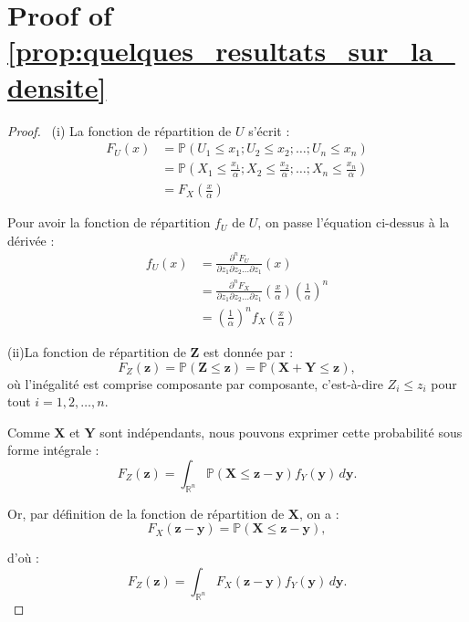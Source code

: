 \documentclass[a4paper,10pt]{article}
\theoremstyle{definition} %
\theoremstyle{definition} %
\theoremstyle{definition} %
\theoremstyle{definition} %
\begin{document}
\section{Proof of \cref{prop:quelques_resultats_sur_la_densite}} \label{sec:proof_quelques_resultates_sur_la_densite}
\begin{proof}\
    (i) La fonction de répartition de $U$ s'écrit :
    \begin{align*}
        F_U(x) &= \mathbb{P}(U_1 \leq x_1;U_2 \leq x_2;\dots;U_n \leq x_n) \\
        &=\mathbb{P}\left(X_1 \leq \frac{x_1}{ \alpha};X_2 \leq \frac{x_2}{\alpha};\dots;X_n \leq \frac{x_n}{ \alpha}\right) \\
        &= F_X\left(\frac{x}{\alpha}\right)
    \end{align*}

    Pour avoir la fonction de répartition $f_U$ de $U$, on passe l'équation ci-dessus à la dérivée :
    \begin{align*}
        f_U(x) &= \frac{\partial^nF_U}{\partial z_1 \partial z_2 \dots\partial z_1}(x) \\
        &= \frac{\partial^nF_X}{\partial z_1 \partial z_2 \dots\partial z_1}\left(\frac{x}{ \alpha}\right) \left(\frac{1}{ \alpha}\right)^n \\
        &=\left(\frac{1}{ \alpha}\right)^n f_X\left(\frac{x}{\alpha}\right)
    \end{align*}

    (ii)La fonction de répartition de \( \mathbf{Z} \) est donnée par :
    \[
    F_Z(\mathbf{z}) = \mathbb{P}(\mathbf{Z} \leq \mathbf{z}) = \mathbb{P}(\mathbf{X} + \mathbf{Y} \leq \mathbf{z}),
    \]
    où l'inégalité est comprise composante par composante, c'est-à-dire \( Z_i \leq z_i \) pour tout \( i = 1,2, \dots, n \).
    
    Comme \( \mathbf{X} \) et \( \mathbf{Y} \) sont indépendants, nous pouvons exprimer cette probabilité sous forme intégrale :
    \[
    F_Z(\mathbf{z}) = \int_{\mathbb{R}^n} \mathbb{P}(\mathbf{X} \leq \mathbf{z} - \mathbf{y}) f_Y(\mathbf{y}) \, d\mathbf{y}.
    \]
    
    Or, par définition de la fonction de répartition de \( \mathbf{X} \), on a :
    \[
    F_X(\mathbf{z} - \mathbf{y}) = \mathbb{P}(\mathbf{X} \leq \mathbf{z} - \mathbf{y}),
    \]
    
    d'où :
    \[
    F_Z(\mathbf{z}) = \int_{\mathbb{R}^n} F_X(\mathbf{z} - \mathbf{y}) f_Y(\mathbf{y}) \, d\mathbf{y}.
    \]
    

\end{proof}
\end{document}
